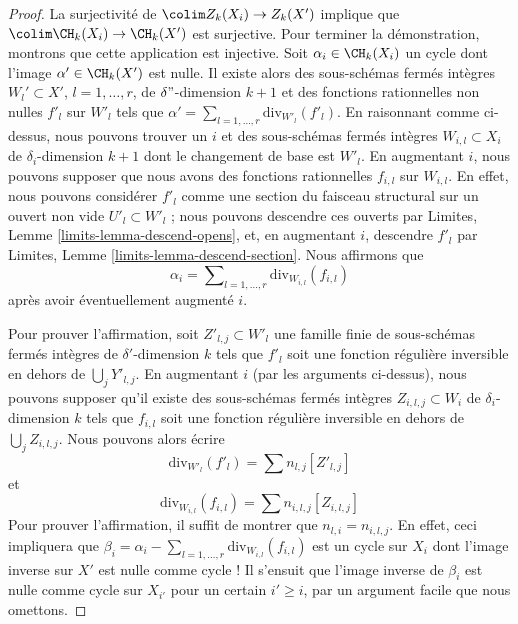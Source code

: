 \begin{proof}
\medskip\noindent
La surjectivité de $\colim Z_k(X_i) \to Z_k(X')$ implique que
$\colim \CH_k(X_i) \to \CH_k(X')$ est surjective.
Pour terminer la démonstration, montrons que cette application est injective.
Soit $\alpha_i \in \CH_k(X_i)$
un cycle dont l'image $\alpha' \in \CH_k(X')$ est nulle.
Il existe alors des sous-schémas fermés intègres
$W_l' \subset X'$, $l = 1, \ldots, r$, de $\delta"$-dimension $k + 1$
et des fonctions rationnelles non nulles $f'_l$ sur $W'_l$
tels que $\alpha' = \sum_{l = 1, \ldots, r} \text{div}_{W'_l}(f'_l)$.
En raisonnant comme ci-dessus, nous pouvons trouver un $i$ et des sous-schémas fermés intègres
$W_{i, l} \subset X_i$ de $\delta_i$-dimension $k + 1$
dont le changement de base est $W'_l$.
En augmentant $i$, nous pouvons supposer que nous avons des fonctions rationnelles
$f_{i, l}$ sur $W_{i, l}$. En effet, nous pouvons considérer $f'_l$ comme une
section du faisceau structural sur un ouvert non vide $U'_l \subset W'_l$ ;
nous pouvons descendre ces ouverts par Limites, Lemme \ref{limits-lemma-descend-opens},
et, en augmentant $i$, descendre $f'_l$ par
Limites, Lemme \ref{limits-lemma-descend-section}.
Nous affirmons que
$$
\alpha_i = \sum\nolimits_{l = 1, \ldots, r} \text{div}_{W_{i, l}}(f_{i, l})
$$
après avoir éventuellement augmenté $i$.

\medskip\noindent
Pour prouver l'affirmation, soit $Z'_{l, j} \subset W'_l$ une famille
finie de sous-schémas fermés intègres de $\delta'$-dimension $k$
tels que $f'_l$ soit une fonction régulière inversible en dehors de
$\bigcup_j Y'_{l, j}$. En augmentant $i$ (par les arguments ci-dessus),
nous pouvons supposer qu'il existe des sous-schémas fermés intègres $Z_{i, l, j} \subset W_i$
de $\delta_i$-dimension $k$ tels que $f_{i, l}$ soit une
fonction régulière inversible en dehors de $\bigcup_j Z_{i, l, j}$.
Nous pouvons alors écrire
$$
\text{div}_{W'_l}(f'_l) = \sum n_{l, j} [Z'_{l, j}]
$$
et
$$
\text{div}_{W_{i, l}}(f_{i, l}) = \sum n_{i, l, j} [Z_{i, l, j}]
$$
Pour prouver l'affirmation, il suffit de montrer que $n_{l, i} = n_{i, l, j}$.
En effet, ceci impliquera que $\beta_i =
\alpha_i - \sum\nolimits_{l = 1, \ldots, r} \text{div}_{W_{i, l}}(f_{i, l})$
est un cycle sur $X_i$ dont l'image inverse sur $X'$ est nulle comme cycle !
Il s'ensuit que l'image inverse de $\beta_i$ est nulle comme cycle sur $X_{i'}$
pour un certain $i' \geq i$, par un argument facile que nous omettons.


\end{proof}
